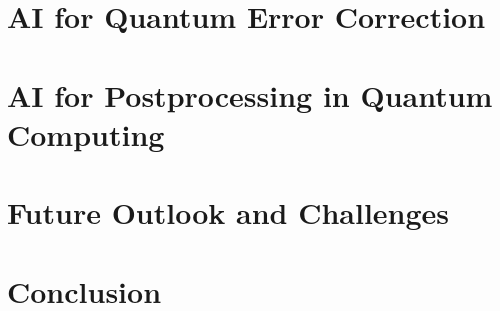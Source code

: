 \documentclass[twocolumn,pra,superscriptaddress,nofootinbib]{revtex4-2}
\begin{document}
\section{AI for Quantum Error Correction}


\section{AI for Postprocessing in Quantum Computing}


\section{Future Outlook and Challenges}


\section{Conclusion}


\printbibliography
\end{document}
